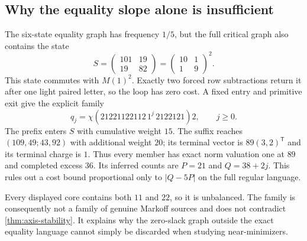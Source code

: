 \subsection{Why the equality slope alone is insufficient}

The six-state equality graph has frequency $1/5$, but the full critical
graph also contains the state
$$
 S=\begin{pmatrix}101&19\\19&82\end{pmatrix}
  =\begin{pmatrix}10&1\\1&9\end{pmatrix}^{\!2}.
$$
This state commutes with $M(1)^2$. Exactly two forced row subtractions
return it after one light paired letter, so the loop has zero cost.
A fixed entry and primitive exit give the explicit family
\begin{equation}
 q_j=\chi(21221122112\,1^j\,2122121)2,\qquad j\geqslant0.
 \label{eq:zero-light-family}
\end{equation}
The prefix enters $S$ with cumulative weight $15$. The suffix reaches
$(109,49;43,92)$ with additional weight $20$; its terminal vector is
$89(3,2)^{\mathsf T}$ and its terminal charge is $1$.
Thus every member has exact norm valuation one at $89$ and completed
excess $36$. Its inferred counts are $P=21$ and $Q=38+2j$.
This rules out a cost bound proportional only to $|Q-5P|$ on the full
regular language.

Every displayed core contains both $11$ and $22$, so it is unbalanced.
The family is consequently not a family of genuine Markoff sources and
does not contradict \cref{thm:axis-stability}. It explains why the
zero-slack graph outside the exact equality language cannot simply be
discarded when studying near-minimizers.
